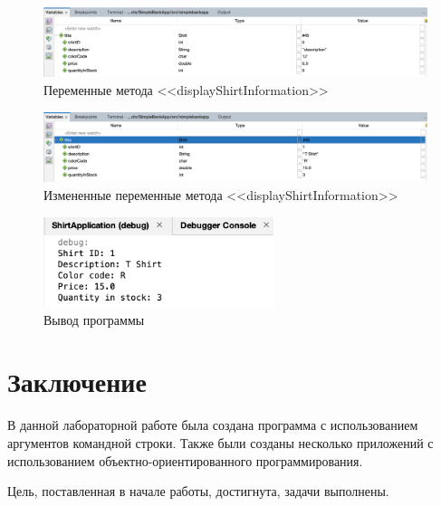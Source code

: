 \documentclass[a4paper, 14pt]{extarticle}
\begin{document}
\begin{figure}[H]
  \centering
  \includegraphics[width=\textwidth]{images/task-3/7.png}
  \caption{
    Переменные метода <<\foreignlanguage{english}{displayShirtInformation}>>
  }
  \label{fig:task-3-7}
\end{figure}

\begin{figure}[H]
  \centering
  \includegraphics[width=\textwidth]{images/task-3/8.png}
  \caption{
    Измененные переменные метода
    <<\foreignlanguage{english}{displayShirtInformation}>>
  }
  \label{fig:task-3-8}
\end{figure}

\begin{figure}[H]
  \centering
  \includegraphics[width=0.6\textwidth]{images/task-3/9.png}
  \caption{Вывод программы}
  \label{fig:task-3-9}
\end{figure}

\newpage

\section*{Заключение}

В данной лабораторной работе была создана программа с использованием аргументов
командной строки. Также были созданы несколько приложений с использованием
объектно-ориентированного программирования.

Цель, поставленная в начале работы, достигнута, задачи выполнены.
\end{document}
